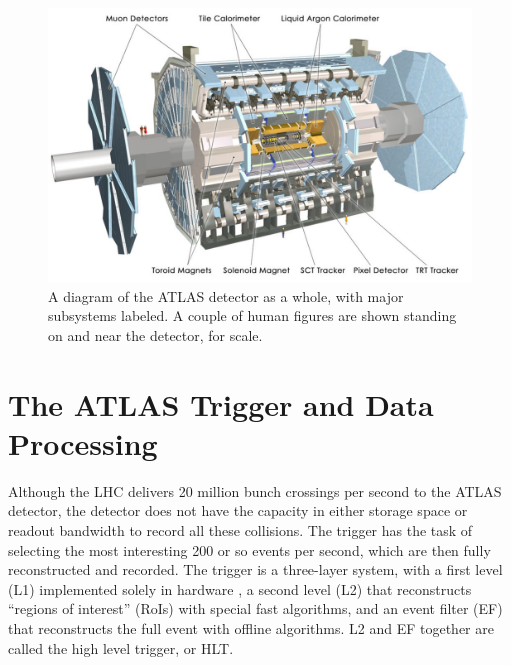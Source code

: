 \begin{figure}
	\includegraphics[width=\textwidth]{ATLASDetector/images/AtlasDetectorLabeled.pdf}	\caption{A diagram of the ATLAS detector as a whole, with major subsystems labeled.  A couple of human figures are shown standing on and near the detector, for scale. \label{fig:detector}}
\end{figure}

\section{The ATLAS Trigger and Data Processing}
\label{sec:atlas_trig}
Although the LHC delivers 20 million bunch crossings per second to the ATLAS detector, the detector does not have 
the capacity in either storage space or readout bandwidth to record all these collisions.  The trigger has the task 
of selecting the most interesting 200 or so events per second, which are then fully reconstructed and recorded.  
The trigger is a three-layer system, with a first level (L1) implemented solely in hardware
, a second level (L2) that reconstructs ``regions of interest'' (RoIs) with special fast 
algorithms, and an event filter (EF) that reconstructs the full event with offline algorithms.  L2 and 
EF together are called the high level trigger, or HLT.



